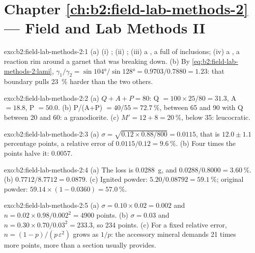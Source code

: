 \section*{Chapter \ref{ch:b2:field-lab-methods-2} --- Field and Lab Methods II}

\begin{solution}{exo:b2:field-lab-methods-2:1}
(a) (i) ; (ii) ; (iii) a , a  full of
inclusions; (iv) a , a reaction rim around a garnet that was breaking down. (b) By
\eqref{eq:b2:field-lab-methods-2:lami}, $\gamma_1/\gamma_2 = \sin\ang{104}/\sin\ang{128} =
0.9703/0.7880 = 1.23$: that boundary pulls \qty{23}{\percent} harder than the two others.
\end{solution}

\begin{solution}{exo:b2:field-lab-methods-2:2}
(a) $Q + A + P = 80$: Q $= 100 \times 25/80 = 31.3$, A $= 18.8$, P $= 50.0$. (b) P/(A+P) $=
40/55 = \qty{72.7}{\percent}$, between 65 and 90 with Q between 20 and 60: a granodiorite.
(c) $M' = 12 + 8 = \qty{20}{\percent}$, below 35: leucocratic.
\end{solution}

\begin{solution}{exo:b2:field-lab-methods-2:3}
(a) $\sigma = \sqrt{0.12 \times 0.88/800} = 0.0115$, that is $12.0 \pm 1.1$ percentage points, a
relative error of $0.0115/0.12 = \qty{9.6}{\percent}$. (b) Four times the points halve it: $0.0057$.
\end{solution}

\begin{solution}{exo:b2:field-lab-methods-2:4}
(a) The loss is \qty{0.0288}{g}, and $0.0288/0.8000 = \qty{3.60}{\percent}$.
(b) $0.7712/8.7712 = 0.0879$.
(c) Ignited powder: $5.20/0.08792 = \qty{59.1}{\percent}$; original powder:
$59.14 \times (1 - 0.0360) = \qty{57.0}{\percent}$.
\end{solution}

\begin{solution}{exo:b2:field-lab-methods-2:5}
(a) $\sigma = 0.10 \times 0.02 = 0.002$ and $n = 0.02 \times 0.98/0.002^2 = 4900$ points.
(b) $\sigma = 0.03$ and $n = 0.30 \times 0.70/0.03^2 = 233.3$, so 234 points. (c) For a fixed relative
error, $n = (1-p)/(p\,\varepsilon^2)$ grows as $1/p$: the accessory mineral demands 21 times more
points, more than a section usually provides.
\end{solution}

